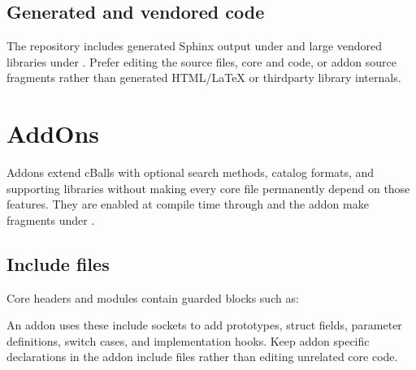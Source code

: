 \documentclass[letterpaper,10pt,english]{sphinxmanual}
\begin{document}
\section{Generated and vendored code}
\label{\detokenize{code_structure:generated-and-vendored-code}}
\sphinxAtStartPar
The repository includes generated Sphinx output under  and large
vendored libraries under . Prefer editing the source  files,
core  and  code, or add\sphinxhyphen{}on source fragments rather than
generated HTML/LaTeX or third\sphinxhyphen{}party library internals.

\sphinxstepscope


\chapter{AddOn\textquotesingle{}s}
\label{\detokenize{addons:addon-s}}\label{\detokenize{addons::doc}}
\sphinxAtStartPar
Add\sphinxhyphen{}ons extend cBalls with optional search methods, catalog formats, and
supporting libraries without making every core file permanently depend on those
features. They are enabled at compile time through  and the
add\sphinxhyphen{}on make fragments under .


\section{Include files}
\label{\detokenize{addons:include-files}}
\sphinxAtStartPar
Core headers and modules contain guarded  blocks such as:

\begin{sphinxVerbatim}[commandchars=\\\{\}]
\end{sphinxVerbatim}

\sphinxAtStartPar
An add\sphinxhyphen{}on uses these include sockets to add prototypes, struct fields,
parameter definitions, switch cases, and implementation hooks. Keep add\sphinxhyphen{}on
specific declarations in the add\sphinxhyphen{}on include files rather than editing unrelated
core code.
\end{document}
